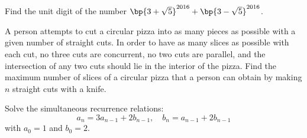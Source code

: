 \begin{problem}[\chili]
    Find the unit digit of the number $\bp{3 + \sqrt5}^{2016} + \bp{3 - \sqrt5}^{2016}$.
\end{problem}

\begin{problem}[\chili]
    A person attempts to cut a circular pizza into as many pieces as possible with a given number of straight cuts. In order to have as many slices as possible with each cut, no three cuts are concurrent, no two cuts are parallel, and the intersection of any two cuts should lie in the interior of the pizza. Find the maximum number of slices of a circular pizza that a person can obtain by making $n$ straight cuts with a knife.
\end{problem}

\begin{problem}[\chili]
    Solve the simultaneous recurrence relations: \[a_n = 3a_{n-1} + 2b_{n-1}, \quad b_n = a_{n-1} + 2b_{n-1}\] with $a_0 = 1$ and $b_0 = 2$.
\end{problem}